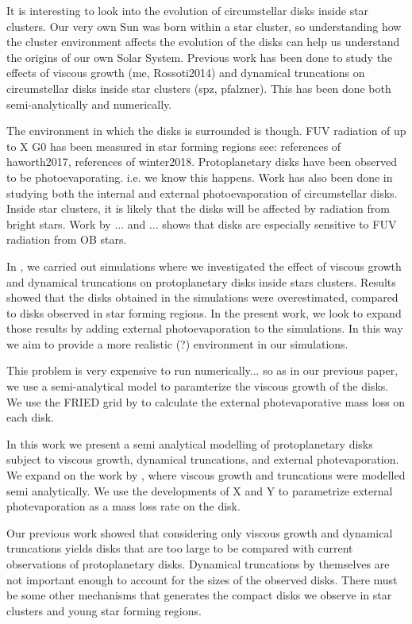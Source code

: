 \documentclass[fleqn,usenatbib]{mnras}
\newcommand\note[1]{{\colorbox{yellow!60}{\color{magenta}#1}}}
\begin{document}
It is interesting to look into the evolution of circumstellar disks inside star clusters. Our very own Sun was born within a star cluster, so understanding how the cluster environment affects the evolution of the disks can help us understand the origins of our own Solar System. Previous work has been done to study the effects of viscous growth (me, Rossoti2014) and dynamical truncations on circumstellar disks inside star clusters (spz, pfalzner). This has been done both semi-analytically and numerically. 

The environment in which the disks is surrounded is though. FUV radiation of up to X G0 has been measured in star forming regions \citep{haworth2017} \note{see: references of haworth2017, references of winter2018}. Protoplanetary disks have been observed to be photoevaporating. i.e. we know this happens. Work has also been done in studying both the internal and external photoevaporation of circumstellar disks. Inside star clusters, it is likely that the disks will be affected by radiation from bright stars. Work by ... and ... shows that disks are especially sensitive to FUV radiation from OB stars.

In \citet{concha-ramirez2018}, we carried out simulations where we investigated the effect of viscous growth and dynamical truncations on protoplanetary disks inside stars clusters. Results showed that the disks obtained in the simulations were overestimated, compared to disks observed in star forming regions. In the present work, we look to expand those results by adding external photoevaporation to the simulations. In this way we aim to provide a more realistic \note{(?)} environment in our simulations. 

This problem is very expensive to run numerically... so as in our previous paper, we use a semi-analytical model to paramterize the viscous growth of the disks. We use the FRIED grid by \citet{haworth2018} to calculate the external photevaporative mass loss on each disk. 


In this work we present a semi analytical modelling of protoplanetary disks subject to viscous growth, dynamical truncations, and external photevaporation. We expand on the work by \citet{concha-ramirez2018}, where viscous growth and truncations were modelled semi analytically. We use the developments of X and Y to parametrize external photevaporation as a mass loss rate on the disk.

Our previous work showed that considering only viscous growth and dynamical truncations yields disks that are too large to be compared with current observations of protoplanetary disks. Dynamical truncations by themselves are not important enough to account for the sizes of the observed disks. There must be some other mechanisms that generates the compact disks we observe in star clusters and young star forming regions.
\end{document}
